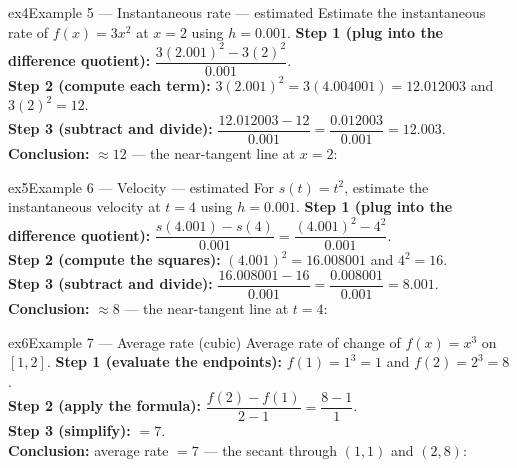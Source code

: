 \documentclass[11pt]{article}
\begin{document}
\begin{example}{ex4}{Example 5 --- Instantaneous rate --- estimated}
Estimate the instantaneous rate of $f(x)=3x^2$ at $x=2$ using $h=0.001$.\soln
\textbf{Step 1 (plug into the difference quotient):} $\dfrac{3(2.001)^2-3(2)^2}{0.001}$.\\[3pt]
\textbf{Step 2 (compute each term):} $3(2.001)^2=3(4.004001)=12.012003$ and $3(2)^2=12$.\\[3pt]
\textbf{Step 3 (subtract and divide):} $\dfrac{12.012003-12}{0.001}=\dfrac{0.012003}{0.001}=12.003$.\\[3pt]
\textbf{Conclusion:} $\approx12$ --- the near-tangent line at $x=2$:
\end{example}

\begin{example}{ex5}{Example 6 --- Velocity --- estimated}
For $s(t)=t^2$, estimate the instantaneous velocity at $t=4$ using $h=0.001$.\soln
\textbf{Step 1 (plug into the difference quotient):} $\dfrac{s(4.001)-s(4)}{0.001}=\dfrac{(4.001)^2-4^2}{0.001}$.\\[3pt]
\textbf{Step 2 (compute the squares):} $(4.001)^2=16.008001$ and $4^2=16$.\\[3pt]
\textbf{Step 3 (subtract and divide):} $\dfrac{16.008001-16}{0.001}=\dfrac{0.008001}{0.001}=8.001$.\\[3pt]
\textbf{Conclusion:} $\approx8$ --- the near-tangent line at $t=4$:\begin{center}\end{center}
\end{example}

\begin{example}{ex6}{Example 7 --- Average rate (cubic)}
Average rate of change of $f(x)=x^3$ on $[1,2]$.\soln
\textbf{Step 1 (evaluate the endpoints):} $f(1)=1^3=1$ and $f(2)=2^3=8$.\\[3pt]
\textbf{Step 2 (apply the formula):} $\dfrac{f(2)-f(1)}{2-1}=\dfrac{8-1}{1}$.\\[3pt]
\textbf{Step 3 (simplify):} $=7$.\\[3pt]
\textbf{Conclusion:} average rate $=7$ --- the secant through $(1,1)$ and $(2,8)$:
\end{example}
\end{document}
